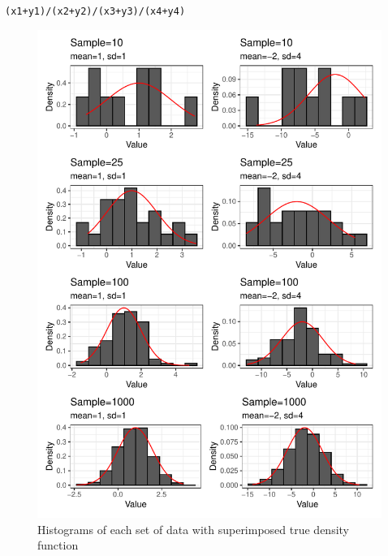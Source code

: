 \documentclass{article}\usepackage[]{graphicx}\usepackage[]{color}
\makeatletter
\def\maxwidth{ %
  \ifdim\Gin@nat@width>\linewidth
    \linewidth
  \else
    \Gin@nat@width
  \fi
}
\newcommand{\hlopt}[1]{\textcolor[rgb]{0,0,0}{#1}}%
\newcommand{\hlstd}[1]{\textcolor[rgb]{0.345,0.345,0.345}{#1}}%
\newenvironment{kframe}{%
 \def\at@end@of@kframe{}%
 \ifinner\ifhmode%
  \def\at@end@of@kframe{\end{minipage}}%
  \begin{minipage}{\columnwidth}%
 \fi\fi%
 \def\FrameCommand##1{\hskip\@totalleftmargin \hskip-\fboxsep
 \colorbox{shadecolor}{##1}\hskip-\fboxsep
     \hskip-\linewidth \hskip-\@totalleftmargin \hskip\columnwidth}%
 \MakeFramed {\advance\hsize-\width
   \@totalleftmargin\z@ \linewidth\hsize
   \@setminipage}}%
 {\par\unskip\endMakeFramed%
 \at@end@of@kframe}
\newenvironment{knitrout}{}{} %
\makeatother
\begin{document}
\begin{enumerate}
\begin{enumerate}
\begin{knitrout}
\begin{kframe}
\begin{alltt}
        \hlstd{(x1}\hlopt{+}\hlstd{y1)}\hlopt{/}\hlstd{(x2}\hlopt{+}\hlstd{y2)}\hlopt{/}\hlstd{(x3}\hlopt{+}\hlstd{y3)}\hlopt{/}\hlstd{(x4}\hlopt{+}\hlstd{y4)}
\end{alltt}
\end{kframe}
\end{knitrout}

\begin{figure}[H]
\begin{center}
\begin{knitrout}
\color{fgcolor}
\includegraphics[width=\maxwidth]{figure/unnamed-chunk-5-1} 
\end{knitrout}
	\caption{Histograms of each set of data with superimposed true density function}
\label{plot3} %
\end{center}
\end{figure}

\end{enumerate}
\end{enumerate}
\end{document}

